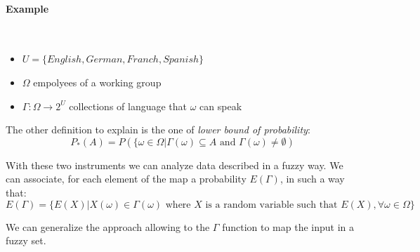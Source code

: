 \documentclass{article}
\begin{document}
\paragraph{Example}\mbox{}\\
\begin{itemize}
    \item $U=\{English, German, Franch, Spanish\}$
    \item $\Omega$ empolyees of a working group
    \item $\Gamma:\Omega\rightarrow 2^U$ collections of language that $\omega$ can speak
\end{itemize}

The other definition to explain is the one of \textit{lower bound of probability}:
$$P_*(A)=P\left(\{\omega\in\Omega|\Gamma(\omega)\subseteq A\text{ and }\Gamma(\omega)\neq\emptyset\right)$$

With these two instruments we can analyze data described in a fuzzy way. We can associate, for each
element of the map a probability $E(\Gamma)$, in such a way that:
$$E(\Gamma)=\{E(X)|X(\omega)\in\Gamma(\omega)\text{ where }X\text{ is a random variable such that }E(X),\forall\omega\in\Omega\}$$

We can generalize the approach allowing to the $\Gamma$ function to map the input in a fuzzy set.
\end{document}
